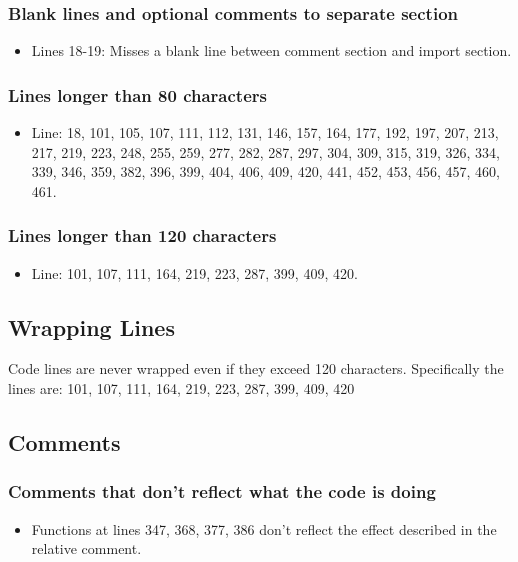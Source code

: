 \subsubsection{Blank lines and optional comments to separate section}
\begin{itemize}
\item Lines 18-19: Misses a blank line between comment section and import section.
\end{itemize}

\subsubsection{Lines longer than 80 characters}
\begin{itemize}
\item Line: 18, 101, 105, 107, 111, 112, 131, 146, 157, 164, 177, 192, 197, 207, 213, 217, 219, 223, 248, 255, 259, 277, 282, 287, 297, 304, 309, 315, 319, 326, 334, 339, 346, 359, 382, 396, 399, 404, 406, 409, 420, 441, 452, 453, 456, 457, 460, 461.
\end{itemize}
\subsubsection{Lines longer than 120 characters} 
\begin{itemize}
\item Line: 101, 107, 111, 164, 219, 223, 287, 399, 409, 420.
\end{itemize}

\subsection{Wrapping Lines}
Code lines are never wrapped even if they exceed 120 characters. Specifically the lines are:
101, 107, 111, 164, 219, 223, 287, 399, 409, 420



\subsection{Comments}
\subsubsection{Comments that don't reflect what the code is doing}
\begin{itemize}
\item Functions at lines 347, 368, 377, 386 don't reflect the effect described in the relative comment.
\end{itemize}

